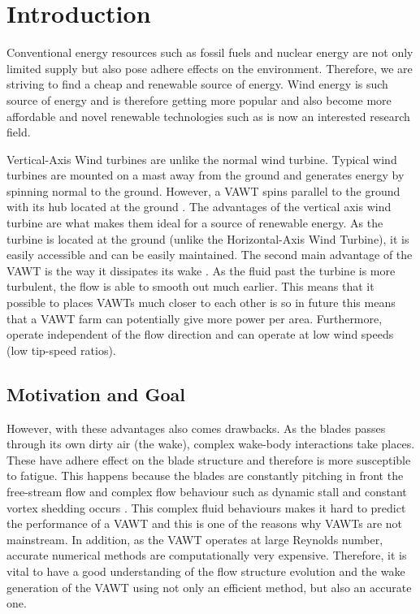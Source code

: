 \chapter{Introduction}
\label{ch:Introduction}

Conventional energy resources such as fossil fuels and nuclear energy are not only limited supply but also pose adhere effects on the environment. Therefore, we are striving to find a cheap and renewable source of energy. Wind energy is such source of energy and is therefore getting more popular and also become more affordable and novel renewable technologies such as  is now an interested research field.

Vertical-Axis Wind turbines are unlike the normal wind turbine. Typical wind turbines are mounted on a mast away from the ground and generates energy by spinning normal to the ground. However, a VAWT spins parallel to the ground with its hub located at the ground \cite{website:wikiVAWT}. The advantages of the vertical axis wind turbine are what makes them ideal for a source of renewable energy.  As the turbine is located at the ground (unlike the Horizontal-Axis Wind Turbine), it is easily accessible and can be easily maintained. The second main advantage of the VAWT is the way it dissipates its wake \cite{Ferreira} \cite{Vermeer2003}. As the fluid past the turbine is more turbulent, the flow is able to smooth out much earlier. This means that it possible to places VAWTs much closer to each other is so in future this means that a VAWT farm can potentially give more power per area. Furthermore, operate independent of the flow direction and can operate at low wind speeds (low tip-speed ratios).

\section{Motivation and Goal}
However, with these advantages also comes drawbacks. As the blades passes through its own dirty air (the wake), complex wake-body interactions take places. These have adhere effect on the blade structure and therefore is more susceptible to fatigue. This happens because the blades are constantly pitching in front the free-stream flow and complex flow behaviour such as dynamic stall and constant vortex shedding occurs \cite{SimaoFerreira2008}. This complex fluid behaviours makes it hard to predict the performance of a VAWT and this is one of the reasons why VAWTs are not mainstream. In addition, as the VAWT operates at large Reynolds number, accurate numerical methods are computationally very expensive. Therefore, it is vital to have a good understanding of the flow structure evolution and the wake generation of the VAWT using not only an efficient method, but also an accurate one.

